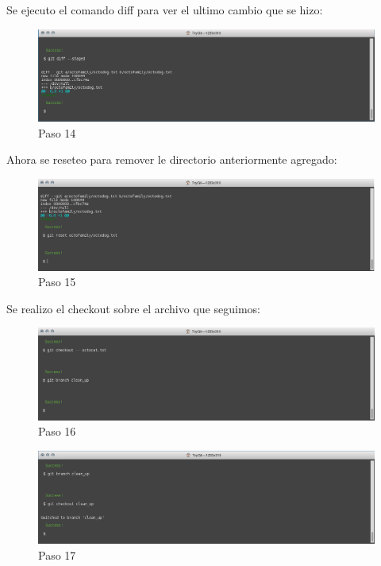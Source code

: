 \documentclass[11pt]{article}
\begin{document}
Se ejecuto el comando diff para ver el ultimo cambio que se hizo:

\begin{figure}[H]
\centering
\includegraphics[scale=0.8]{img/14.png}
\caption{Paso 14}
\label{fig:14}
\end{figure}

Ahora se reseteo para remover le directorio anteriormente agregado:


\begin{figure}[H]
\centering
\includegraphics[scale=0.8]{img/15.png}
\caption{Paso 15}
\label{fig:15}
\end{figure}

Se realizo el checkout sobre el archivo que seguimos:	

\begin{figure}[H]
\centering
\includegraphics[scale=0.8]{img/16.png}
\caption{Paso 16}
\label{fig:16}
\end{figure}

\begin{figure}[H]
\centering
\includegraphics[scale=0.8]{img/17.png}
\caption{Paso 17}
\label{fig:17}
\end{figure}
\end{document}
